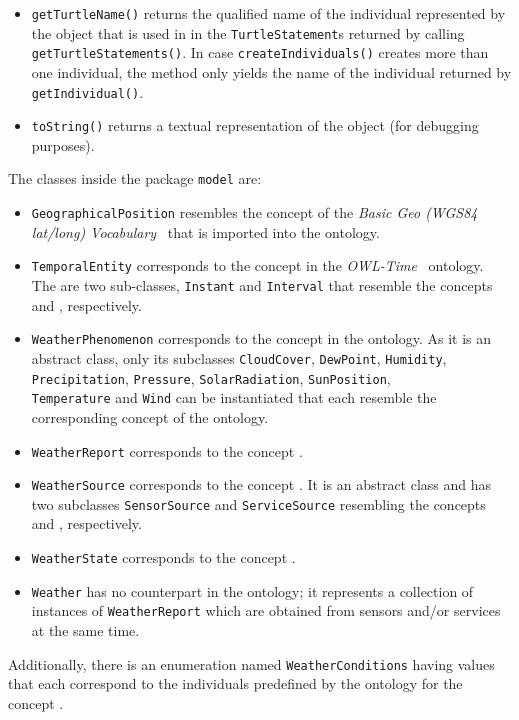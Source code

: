 \begin{itemize}
  \item \texttt{getTurtleName()} returns the qualified name of the individual represented by the object that is used in in the \texttt{TurtleStatement}s returned by calling \texttt{get\hspace{0pt}Turtle\hspace{0pt}Statements()}. In case \texttt{createIndividuals()} creates more than one individual, the method only yields the name of the individual returned by \texttt{getIndividual()}.
  
  \item \texttt{toString()} returns a textual representation of the object (for debugging purposes).
\end{itemize}

The classes inside the package \texttt{model} are:
\begin{itemize}
  \item \texttt{GeographicalPosition} resembles the concept  of the \emph{Basic Geo (WGS84 lat/long) Vocabulary}~\cite{wgs84_vocabulary} that is imported into the \smarthomeweather ontology.
  
  \item \texttt{TemporalEntity} corresponds to the concept  in the \emph{OWL-Time}~\cite{owl-time} ontology. The are two sub-classes, \texttt{Instant} and \texttt{Interval} that resemble the concepts  and , respectively.
  
  \item \texttt{WeatherPhenomenon} corresponds to the concept  in the \smarthomeweather ontology. As it is an abstract class, only its subclasses \texttt{CloudCover}, \texttt{DewPoint}, \texttt{Humidity}, \texttt{Precipitation}, \texttt{Pressure}, \texttt{SolarRadiation}, \texttt{SunPosition}, \\ \texttt{Temperature} and \texttt{Wind} can be instantiated that each resemble the corresponding concept of the ontology.
  
  \item \texttt{WeatherReport} corresponds to the concept .
  
  \item \texttt{WeatherSource} corresponds to the concept . It is an abstract class and has two subclasses \texttt{SensorSource} and \texttt{ServiceSource} resembling the concepts  and , respectively.
  
  \item \texttt{WeatherState} corresponds to the concept .
  
  \item \texttt{Weather} has no counterpart in the ontology; it represents a collection of instances of \texttt{WeatherReport} which are obtained from sensors and/or services at the same time.
\end{itemize}
% 
Additionally, there is an enumeration named \texttt{WeatherConditions} having values that each correspond to the individuals predefined by the ontology for the concept .

